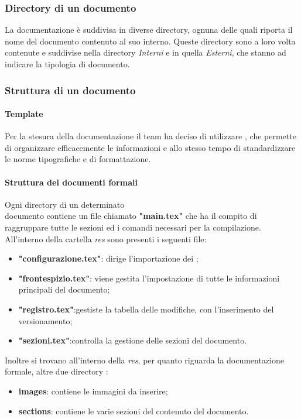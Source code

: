\subsubsection{Directory di un documento}
La documentazione è suddivisa in diverse directory, ognuna delle quali riporta il nome del documento contenuto al suo interno. Queste directory sono a loro volta contenute e suddivise nella directory \textit{Interni} e in quella \textit{Esterni}, che stanno ad indicare la tipologia di documento.

\subsubsection{Struttura di un documento}
\paragraph{Template} 
Per la stesura della documentazione il team ha deciso di utilizzare , che permette di organizzare efficacemente le informazioni e allo stesso tempo di standardizzare le norme tipografiche e di formattazione.

\paragraph{Struttura dei documenti formali}
Ogni directory di un determinato\\ documento contiene un file chiamato \textbf{"main.tex"} che ha il compito di raggruppare tutte le sezioni ed i comandi necessari per la compilazione.\\
All'interno della cartella \textit{res} sono presenti i seguenti file:
\begin{itemize}
	\item \textbf{"configurazione.tex"}: dirige l'importazione dei ;
	\item \textbf{"frontespizio.tex"}: viene gestita l'impostazione di tutte le informazioni principali del documento;
	\item \textbf{"registro.tex"}:gestiste la tabella delle modifiche, con l'inserimento del versionamento;
	\item \textbf{"sezioni.tex"}:controlla la gestione delle sezioni del documento.
\end{itemize}
Inoltre si trovano all'interno della \textit{res}, per quanto riguarda la documentazione formale, altre due directory :
\begin{itemize}
	\item \textbf{images}: contiene le immagini da inserire;
	\item\textbf{sections}: contiene le varie sezioni del contenuto del documento.
\end{itemize}

